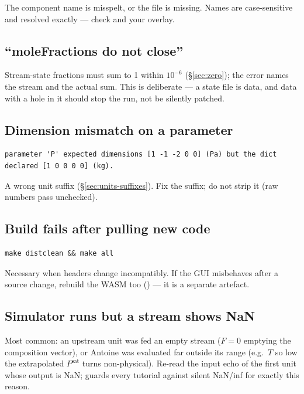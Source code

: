 \documentclass[11pt,a4paper]{article}
\begin{document}
The component name is misspelt, or the file is missing.  Names are
case-sensitive and resolved exactly ---
check  and your
 overlay.

\subsection*{``moleFractions do not close''}

Stream-state fractions must sum to 1 within $10^{-6}$
(\S\ref{sec:zero}); the error names the stream and the actual sum.
This is deliberate --- a state file is data, and data with a hole in it
should stop the run, not be silently patched.

\subsection*{Dimension mismatch on a parameter}

\begin{lstlisting}
parameter 'P' expected dimensions [1 -1 -2 0 0] (Pa) but the dict
declared [1 0 0 0 0] (kg).
\end{lstlisting}

A wrong unit suffix (\S\ref{sec:units-suffixes}).  Fix the suffix; do
not strip it (raw numbers pass unchecked).

\subsection*{Build fails after pulling new code}

\begin{lstlisting}
make distclean && make all
\end{lstlisting}

Necessary when headers change incompatibly.  If the GUI misbehaves
after a source change, rebuild the WASM too () ---
it is a separate artefact.

\subsection*{Simulator runs but a stream shows NaN}

Most common: an upstream unit was fed an empty stream ($F = 0$
emptying the composition vector), or Antoine was evaluated far outside
its range (e.g.\ $T$ so low the extrapolated $P^{\mathrm{sat}}$ turns
non-physical).  Re-read the input echo of the first unit whose output
is NaN;  guards every tutorial against silent
NaN/inf for exactly this reason.
\end{document}
